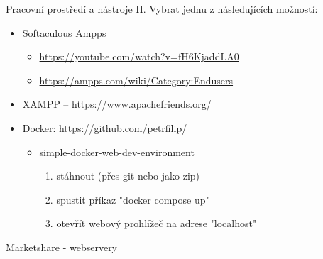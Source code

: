 \documentclass{beamer}
\begin{document}
\begin{frame}{Pracovní prostředí a nástroje II.}
Vybrat jednu z následujících možností:

	\begin{itemize}
		\item Softaculous Ampps
			\begin{itemize}
				\item \url{https://youtube.com/watch?v=fH6KjaddLA0}
				\item \url{https://ampps.com/wiki/Category:Endusers}
			\end{itemize}
	\end{itemize}

	\begin{itemize}
		\item XAMPP -- \url{https://www.apachefriends.org/}
	\end{itemize}

	\begin{itemize}
		\item Docker:  \url{https://github.com/petrfilip/}
		\begin{itemize}
			\item simple-docker-web-dev-environment
			\begin{enumerate}
				\item stáhnout (přes git nebo jako zip)
				\item spustit příkaz "docker compose up"
				\item otevřít webový prohlížeč na adrese "localhost"
			\end{enumerate}
		\end{itemize}	
	\end{itemize}

\end{frame}


\begin{frame}{Marketshare - webservery}
\end{frame}
\end{document}
